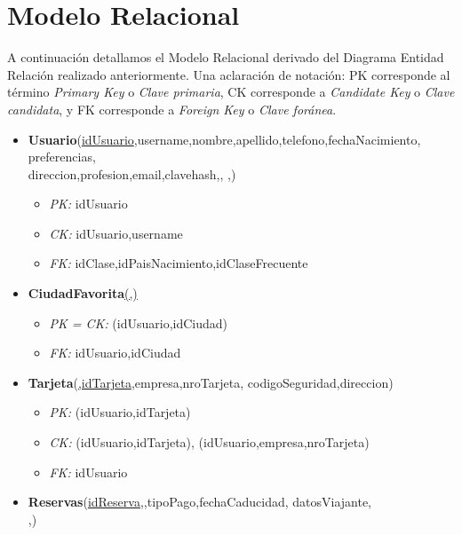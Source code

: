 \section{Modelo Relacional}

A continuaci\'on detallamos el Modelo Relacional derivado del
Diagrama Entidad Relaci\'on realizado anteriormente. Una aclaraci\'on
de notaci\'on: PK corresponde al t\'ermino \textit{Primary Key} o \textit{Clave primaria},
CK corresponde a \textit{Candidate Key} o \textit{Clave candidata}, y FK corresponde a
\textit{Foreign Key} o \textit{Clave for\'anea}.

\begin{itemize}
	\item \textbf{Usuario}(\underline{idUsuario},username,nombre,apellido,telefono,fechaNacimiento,
	preferencias,\\ direccion,profesion,email,clavehash,,
	,)
		\begin{itemize}
			\item \textit{PK:} idUsuario
			\item \textit{CK:} idUsuario,username
			\item \textit{FK:} idClase,idPaisNacimiento,idClaseFrecuente
		\end{itemize}
	\item \textbf{CiudadFavorita}\underline{(,)}
		\begin{itemize}
			\item \textit{PK = CK: } (idUsuario,idCiudad)
			\item \textit{FK:} idUsuario,idCiudad
		\end{itemize}
	\item \textbf{Tarjeta}(\underline{,idTarjeta},empresa,nroTarjeta,
	codigoSeguridad,direccion)
		\begin{itemize}
			\item \textit{PK:} (idUsuario,idTarjeta)
			\item \textit{CK:} (idUsuario,idTarjeta), (idUsuario,empresa,nroTarjeta)
			\item \textit{FK:} idUsuario
		\end{itemize}
	\item \textbf{Reservas}(\underline{idReserva},,tipoPago,fechaCaducidad, datosViajante,
		\\,)
		\begin{itemize}

\end{itemize}
\end{itemize}
